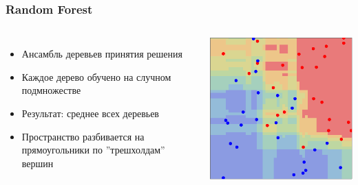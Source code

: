 \documentclass{beamer}
\begin{document}
\begin{frame}
    \frametitle{Random Forest}
    \begin{columns}
            \begin{itemize}
                    \item Ансамбль деревьев принятия решения
                    \item Каждое дерево обучено на случном подмножестве
                    \item Результат: среднее всех деревьев 
                    \item Пространство разбивается на прямоугольники по ''трешхолдам'' вершин
            \end{itemize}
        \includegraphics[width=\textwidth]{random_forest.png}
    \end{columns}
\end{frame}
\end{document}
